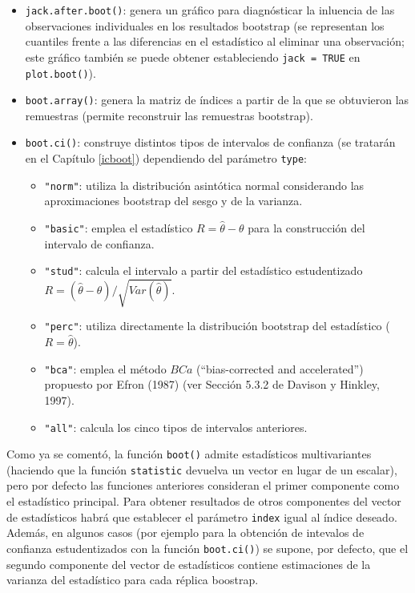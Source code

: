 \documentclass[
]{book}
\theoremstyle{break}
\theoremstyle{definition}
\theoremstyle{definition}
\theoremstyle{definition}
\theoremstyle{remark}
\begin{document}
\begin{itemize}
\item
  \texttt{jack.after.boot()}: genera un gráfico para diagnósticar la inluencia
  de las observaciones individuales en los resultados bootstrap
  (se representan los cuantiles frente a las diferencias en el estadístico
  al eliminar una observación; este gráfico también se puede obtener estableciendo
  \texttt{jack\ =\ TRUE} en \texttt{plot.boot()}).
\item
  \texttt{boot.array()}: genera la matriz de índices a partir de la que se obtuvieron las remuestras (permite reconstruir las remuestras bootstrap).
\item
  \texttt{boot.ci()}: construye distintos tipos de intervalos de confianza
  (se tratarán en el Capítulo \ref{icboot}) dependiendo del parámetro \texttt{type}:

  \begin{itemize}
  \item
    \texttt{"norm"}: utiliza la distribución asintótica normal considerando las
    aproximaciones bootstrap del sesgo y de la varianza.
  \item
    \texttt{"basic"}: emplea el estadístico \(R = \hat \theta - \theta\) para la
    construcción del intervalo de confianza.
  \item
    \texttt{"stud"}: calcula el intervalo a partir del estadístico estudentizado
    \(R = \left( \hat \theta - \theta \right) / \sqrt{Var(\hat \theta)}\).
  \item
    \texttt{"perc"}: utiliza directamente la distribución bootstrap del estadístico
    (\(R = \hat \theta\)).
  \item
    \texttt{"bca"}: emplea el método \(BCa\) (``bias-corrected and accelerated'')
    propuesto por Efron (1987) (ver Sección 5.3.2 de Davison y Hinkley, 1997).
  \item
    \texttt{"all"}: calcula los cinco tipos de intervalos anteriores.
  \end{itemize}
\end{itemize}

Como ya se comentó, la función \texttt{boot()} admite estadísticos multivariantes
(haciendo que la función \texttt{statistic} devuelva un vector en lugar de un escalar),
pero por defecto las funciones anteriores consideran el primer componente
como el estadístico principal.
Para obtener resultados de otros componentes del vector de estadísticos
habrá que establecer el parámetro \texttt{index} igual al índice deseado.
Además, en algunos casos (por ejemplo para la obtención de intevalos de confianza
estudentizados con la función \texttt{boot.ci()}) se supone, por defecto, que el segundo
componente del vector de estadísticos contiene estimaciones de la varianza del
estadístico para cada réplica boostrap.
\end{document}
